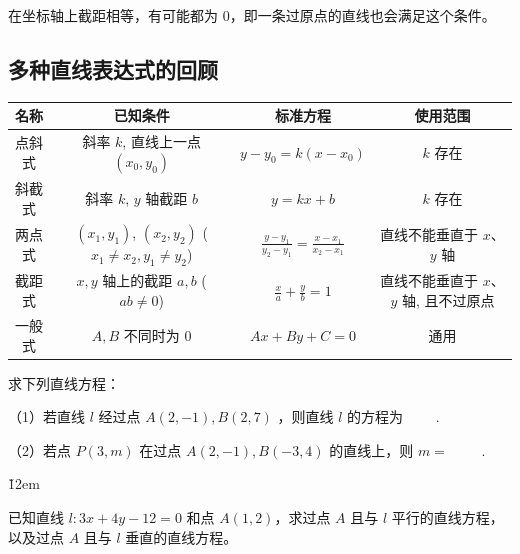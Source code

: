 \begin{warning}
    在坐标轴上截距相等，有可能都为 $0$，即一条过原点的直线也会满足这个条件。
\end{warning}

\subsection{多种直线表达式的回顾}
\begin{center}
    \begin{tabular}{|c|c|c|c|}
        \hline
        \textbf{名称} & \textbf{已知条件}                                             & \textbf{标准方程}                                   & \textbf{使用范围}            \\
        \hline
        点斜式         & 斜率 $k$, 直线上一点 $(x_0,y_0)$                                 & $y-y_0 = k(x-x_0)$                              & $k$ 存在                   \\
        \hline
        斜截式         & 斜率 $k$, $y$ 轴截距 $b$                                       & $y=kx+b$                                        & $k$ 存在                   \\
        \hline
        两点式         & $(x_1, y_1)$, $(x_2, y_2)$ ($x_1 \neq x_2, y_1 \neq y_2$) & $\frac{y-y_1}{y_2-y_1} = \frac{x-x_1}{x_2-x_1}$ & 直线不能垂直于 $x$、$y$ 轴        \\
        \hline
        截距式         & $x,y$ 轴上的截距 $a,b$ ($ab \neq 0$)                           & $\frac{x}{a} + \frac{y}{b} = 1$                 & 直线不能垂直于 $x$、$y$ 轴, 且不过原点 \\
        \hline
        一般式         & $A, B$ 不同时为 $0$                                           & $Ax+By+C=0$                                     & 通用                       \\
        \hline
    \end{tabular}
\end{center}

\begin{problem}
求下列直线方程：

（1）若直线 $l$ 经过点 $A(2,-1), B(2,7)$ ，则直线 $l$ 的方程为 \underline{$\qquad$}.

（2）若点 $P(3, m)$ 在过点 $A(2,-1), B(-3,4)$ 的直线上，则 $m=$ \underline{$\qquad$}.
\end{problem}

\v{12em}

\begin{example}
    已知直线 $l: 3x + 4y - 12 = 0$ 和点 $A(1,2)$，求过点 $A$ 且与 $l$ 平行的直线方程，以及过点 $A$ 且与 $l$ 垂直的直线方程。
\end{example}

